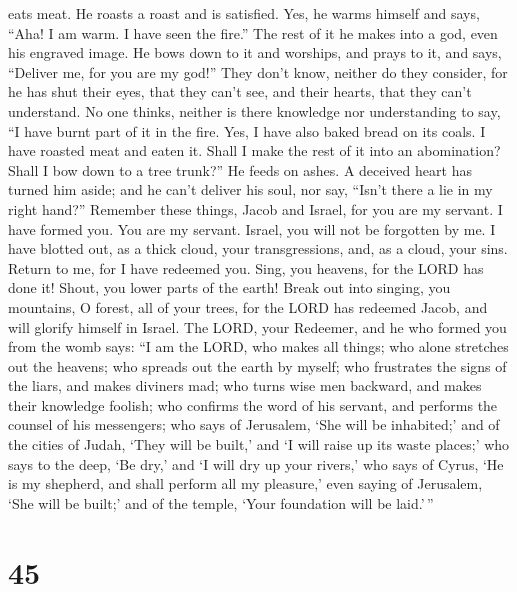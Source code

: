 eats meat. He roasts a roast and is satisfied. Yes, he warms himself and
says, ``Aha! I am warm. I have seen the fire.''  The rest
of it he makes into a god, even his engraved image. He bows down to it
and worships, and prays to it, and says, ``Deliver me, for you are my
god!''  They don't know, neither do they consider, for he
has shut their eyes, that they can't see, and their hearts, that they
can't understand.  No one thinks, neither is there
knowledge nor understanding to say, ``I have burnt part of it in the
fire. Yes, I have also baked bread on its coals. I have roasted meat and
eaten it. Shall I make the rest of it into an abomination? Shall I bow
down to a tree trunk?''  He feeds on ashes. A deceived
heart has turned him aside; and he can't deliver his soul, nor say,
``Isn't there a lie in my right hand?''  Remember these
things, Jacob and Israel, for you are my servant. I have formed you. You
are my servant. Israel, you will not be forgotten by me. 
I have blotted out, as a thick cloud, your transgressions, and, as a
cloud, your sins. Return to me, for I have redeemed you. 
Sing, you heavens, for the LORD has done it! Shout, you lower parts of
the earth! Break out into singing, you mountains, O forest, all of your
trees, for the LORD has redeemed Jacob, and will glorify himself in
Israel.  The LORD, your Redeemer, and he who formed you
from the womb says: ``I am the LORD, who makes all things; who alone
stretches out the heavens; who spreads out the earth by myself;
 who frustrates the signs of the liars, and makes
diviners mad; who turns wise men backward, and makes their knowledge
foolish;  who confirms the word of his servant, and
performs the counsel of his messengers; who says of Jerusalem, `She will
be inhabited;' and of the cities of Judah, `They will be built,' and `I
will raise up its waste places;'  who says to the deep,
`Be dry,' and `I will dry up your rivers,'  who says of
Cyrus, `He is my shepherd, and shall perform all my pleasure,' even
saying of Jerusalem, `She will be built;' and of the temple, `Your
foundation will be laid.'\,''

\hypertarget{section-44}{%
\section{45}\label{section-44}}

